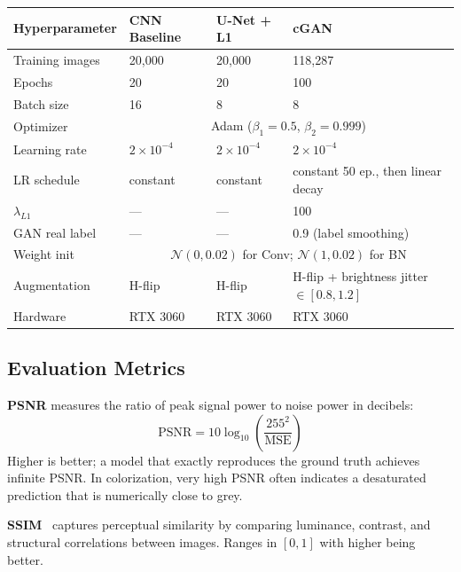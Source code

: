 \documentclass[11pt,a4paper]{article}
\begin{document}
\begin{center}
\begin{tabular}{llll}
\toprule
\textbf{Hyperparameter} & \textbf{CNN Baseline} & \textbf{U-Net + L1} & \textbf{cGAN} \\
\midrule
Training images  & 20,000     & 20,000     & 118,287 \\
Epochs           & 20         & 20         & 100 \\
Batch size       & 16         & 8          & 8 \\
Optimizer        & \multicolumn{3}{c}{Adam ($\beta_1=0.5$, $\beta_2=0.999$)} \\
Learning rate    & $2{\times}10^{-4}$  & $2{\times}10^{-4}$  & $2{\times}10^{-4}$ \\
LR schedule      & constant   & constant   & constant 50 ep., then linear decay \\
$\lambda_{L1}$   & ---        & ---        & 100 \\
GAN real label   & ---        & ---        & 0.9 (label smoothing) \\
Weight init      & \multicolumn{3}{c}{$\mathcal{N}(0, 0.02)$ for Conv; $\mathcal{N}(1, 0.02)$ for BN} \\
Augmentation     & H-flip     & H-flip     & H-flip + brightness jitter $\in [0.8, 1.2]$ \\
Hardware         & RTX 3060   & RTX 3060   & RTX 3060 \\
\bottomrule
\end{tabular}
\end{center}

\subsection{Evaluation Metrics}

\textbf{PSNR} measures the ratio of peak signal power to noise power in decibels:
\begin{equation}
  \text{PSNR} = 10 \log_{10}\!\left(\frac{255^2}{\text{MSE}}\right)
\end{equation}
Higher is better; a model that exactly reproduces the ground truth achieves
infinite PSNR. In colorization, very high PSNR often indicates a desaturated
prediction that is numerically close to grey.

\textbf{SSIM}~\cite{wang2004ssim} captures perceptual similarity by comparing
luminance, contrast, and structural correlations between images. Ranges in $[0,1]$
with higher being better.
\end{document}
